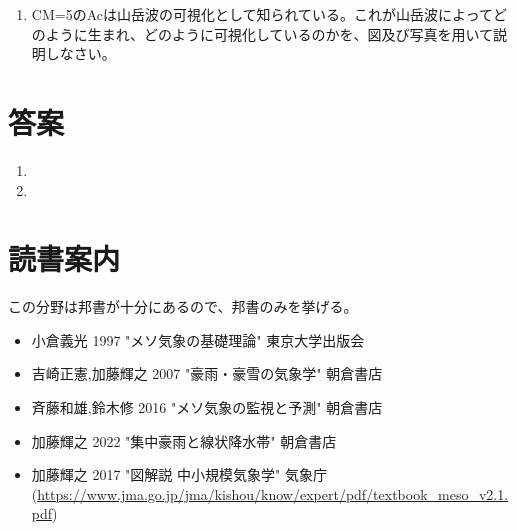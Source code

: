 \documentclass{jsarticle}
\newenvironment{problems}
{
  \renewcommand\labelenumi{\doublebox{\arabic{enumi}}}
  \begin{enumerate}
}{
  \end{enumerate}
  \renewcommand\labelenumi{\arabic{enumi}.}
}
\begin{document}
\begin{problems}
    \item CM=5のAcは山岳波の可視化として知られている。これが山岳波によってどのように生まれ、どのように可視化しているのかを、図及び写真を用いて説明しなさい。
    \end{problems}

\section{答案}
\begin{problems}
\item 

\item 


\end{problems}

\section{読書案内}
この分野は邦書が十分にあるので、邦書のみを挙げる。
\begin{itemize}
\item 小倉義光 1997 "メソ気象の基礎理論" 東京大学出版会
\item 吉崎正憲,加藤輝之 2007 "豪雨・豪雪の気象学" 朝倉書店
\item 斉藤和雄,鈴木修 2016 "メソ気象の監視と予測" 朝倉書店
\item 加藤輝之 2022 "集中豪雨と線状降水帯" 朝倉書店
\item 加藤輝之 2017 "図解説 中小規模気象学" 気象庁 (\url{https://www.jma.go.jp/jma/kishou/know/expert/pdf/textbook_meso_v2.1.pdf})
\end{itemize}
\end{document}
